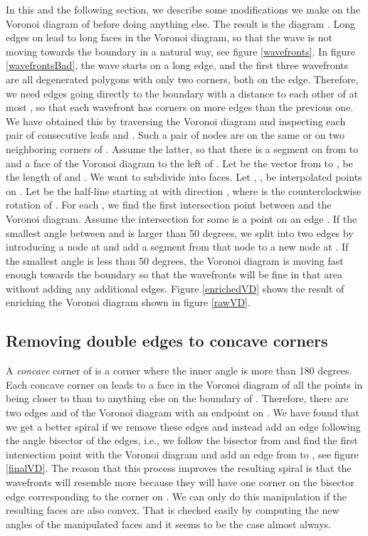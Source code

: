 \documentclass[3p]{elsarticle}
\begin{document}
In this and the following section, we describe some modifications we make on the Voronoi
diagram of  before doing anything else. The result is the diagram .
Long edges on  lead to long
faces in the Voronoi diagram,
so that the wave is not moving towards the boundary 
in a natural way, see figure \ref{wavefronts}.
In figure \ref{wavefrontsBad}, the wave starts on a long edge, and the first three
wavefronts are all degenerated polygons with only two corners, both on the edge.
Therefore, we need edges going directly to the boundary with a distance to each other
of at most ,
so that each wavefront has corners on more edges than the previous one.
We have obtained this by traversing the Voronoi diagram and inspecting each pair of
consecutive leafs  and . Such a pair of nodes are
on the same or on two neighboring corners of . Assume the latter, so that
there is a segment  on  from  to  and a face  of the Voronoi diagram
to the left of .
Let  be the vector from  to ,
 be the length of  and
. We want to subdivide  into  faces.
Let
, , be interpolated points on .
Let  be the half-line starting at  with direction ,
where  is the counterclockwise rotation of .
For each , we find the first intersection point between  and the Voronoi
diagram. Assume the intersection for some  is a point  on an edge .
If the smallest angle between
 and  is larger than 50 degrees, we split  into two edges by introducing a node at 
and add a segment from that node to a new node at . If the smallest angle is less than 50 degrees,
the Voronoi diagram is moving fast enough towards the boundary so that the wavefronts will be fine
in that area without adding any additional edges.
Figure \ref{enrichedVD} shows the result of enriching the Voronoi diagram shown in
figure \ref{rawVD}.

\subsection{Removing double edges to concave corners}\label{removing}

A \emph{concave} corner of  is a corner where the inner angle is more than 180 degrees.
Each concave corner  on  leads to a face in the Voronoi diagram of all the points
in  being closer to  than to anything else on the boundary of .
Therefore, there are two edges  and  of the Voronoi diagram with an endpoint on .
We have found that we get a better spiral if we remove these
edges and instead add an edge following the angle bisector of the edges, i.e., we follow the bisector
from  and find the first intersection point  with the Voronoi diagram and add an edge from
 to , see figure \ref{finalVD}.
The reason that this process improves the resulting spiral is that the wavefronts
will resemble  more because they will have one corner on the
bisector edge corresponding to the corner  on .
We can only do this manipulation if the resulting
faces are also convex. That is checked easily by computing the new angles of the manipulated faces
and it seems to be the case almost always.
\end{document}
